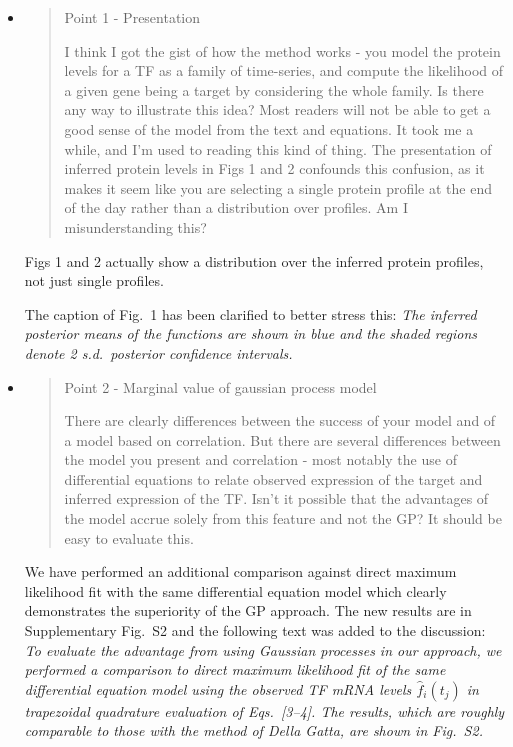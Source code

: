 \documentclass{article}
\begin{document}
\begin{itemize}
\item \begin{quote}
Point 1 - Presentation 

I think I got the gist of how the method works - you model the protein
levels for a TF as a family of time-series, and compute the likelihood
of a given gene being a target by considering the whole family. Is
there any way to illustrate this idea? Most readers will not be able
to get a good sense of the model from the text and equations. It took
me a while, and I'm used to reading this kind of thing. The
presentation of inferred protein levels in Figs 1 and 2 confounds this
confusion, as it makes it seem like you are selecting a single protein
profile at the end of the day rather than a distribution over
profiles. Am I misunderstanding this?
\end{quote}

Figs 1 and 2 actually show a distribution over the inferred protein
profiles, not just single profiles.

The caption of Fig.~1 has been clarified to better stress this:
\emph{The inferred posterior means of the functions are shown in blue
  and the shaded regions denote 2 s.d.\ posterior confidence
  intervals.}

\item \begin{quote}
Point 2 - Marginal value of gaussian process model 

There are clearly differences between the success of your model and of
a model based on correlation. But there are several differences
between the model you present and correlation - most notably the use
of differential equations to relate observed expression of the target
and inferred expression of the TF. Isn't it possible that the
advantages of the model accrue solely from this feature and not the
GP? It should be easy to evaluate this.
\end{quote}

We have performed an additional comparison against direct maximum
likelihood fit with the same differential equation model which clearly
demonstrates the superiority of the GP approach.  The new results are
in Supplementary Fig.~S2 and the following text was added to the
discussion:
\emph{To evaluate the advantage from using Gaussian processes in our
approach, we performed a comparison to direct maximum likelihood fit
of the same differential equation model using the observed TF mRNA
levels $\hat{f}_i(t_j)$ in trapezoidal quadrature evaluation of
Eqs.~[3--4].  The
results, which are roughly comparable to those with the method of
Della Gatta, are shown in Fig.~S2.}


\end{itemize}
\end{document}
